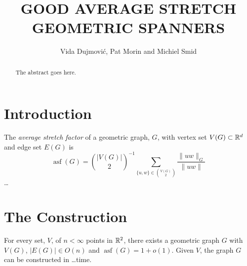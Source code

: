 \documentclass{patmorin}
\title{\MakeUppercase{Good Average Stretch Geometric Spanners}}
\author{Vida Dujmovi\'c, Pat Morin and Michiel Smid}
\DeclareMathOperator{\asf}{asf}
\begin{document}
\begin{titlepage}
\maketitle

\begin{abstract}
  The abstract goes here.
\end{abstract}

\end{titlepage}

\section{Introduction}

The \emph{average stretch factor} of a geometric graph, $G$, with vertex
set $V(G)\subset \mathbb{R}^d$ and edge set $E(G)$ is
\[
    \asf(G) = \binom{|V(G)|}{2}^{-1}\sum_{\{u,w\}\in\binom{V(G)}{2}}\frac{\|uw\|_G}{\|uw\|}
\]
\ldots

\section{The Construction}

\begin{thm}
  For every set, $V$, of $n<\infty$ points in $\mathbb{R}^2$, there exists a
  geometric graph $G$ with $V(G)$, $|E(G)|\in O(n)$ and $\asf(G)=1+o(1)$.
  Given $V$, the graph $G$ can be constructed in \ldots time.
\end{thm}
\end{document}
